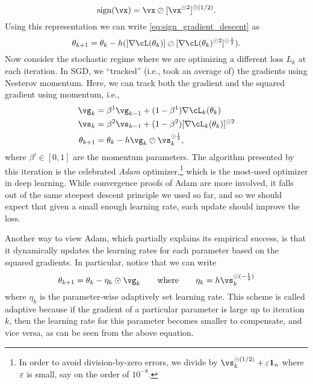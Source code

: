\documentclass[../../book-main.tex]{subfiles}
\begin{document}
\begin{equation}
    \sign(\vx) = \vx \oslash [\vx^{\odot 2}]^{\odot (1/2)}.
\end{equation}
Using this representation we can write \eqref{eq:sign_gradient_descent} as 
\begin{equation}
    \theta_{k + 1} = \theta_{k} - h ([\nabla \cL(\theta_{k})] \oslash [\nabla \cL(\theta_{k})^{\odot 2}]^{\odot \frac{1}{2}}).
\end{equation}
Now consider the stochastic regime where we are optimizing a different loss \(L_{k}\) at each iteration. In SGD, we ``tracked'' (i.e., took an average of) the gradients using Nesterov momentum. Here, we can track both the gradient and the squared gradient using momentum, i.e.,
\begin{align}
    \vg_{k}
    &= \beta^{1}\vg_{k - 1} + (1 - \beta^{1})\nabla \cL_{k}(\theta_{k}) \\ 
    \vs_{k}
    &= \beta^{2}\vs_{k - 1} + (1 - \beta^{2})[\nabla \cL_{k}(\theta_{k})]^{\odot 2}  \\
    \theta_{k + 1}
    &= \theta_{k} - h\vg_{k}\oslash\vs_{k}^{\odot \frac{1}{2}},
\end{align}
where \(\beta^{i} \in [0, 1]\) are the momentum parameters. The algorithm presented by this iteration is the celebrated \textit{Adam} optimizer,\footnote{In order to avoid division-by-zero errors, we divide by \(\vs_{k}^{\odot (1/2)} + \eps \vone_{n}\) where \(\varepsilon\) is small, say on the order of \(10^{-8}\).} which is the most-used optimizer in deep learning. While convergence proofs of Adam are more involved, it falls out of the same steepest descent principle we used so far, and so we should expect that given a small enough learning rate, each update should improve the loss.

Another way to view Adam, which partially explains its empirical success, is that it dynamically updates the learning rates for each parameter based on the squared gradients. In particular, notice that we can write
\begin{equation}
    \theta_{k + 1} = \theta_{k} - \eta_{k} \odot \vg_{k} \qquad \text{where} \qquad \eta_{k} = h \vs_{k}^{\odot (-\frac{1}{2})}
\end{equation}
where \(\eta_{k}\) is the parameter-wise adaptively set learning rate. This scheme is called adaptive because if the gradient of a particular parameter is large up to iteration \(k\), then the learning rate for this parameter becomes smaller to compensate, and vice versa, as can be seen from the above equation.
\end{document}

